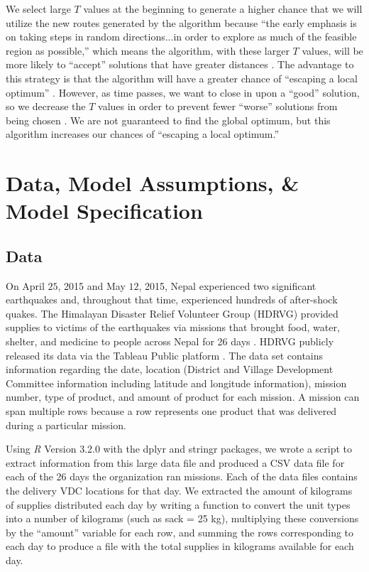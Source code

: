 \documentclass[11pt]{article}
\begin{document}
\noindent We select large $T$ values at the beginning to generate a higher chance that we will utilize the new routes generated by the algorithm because ``the early emphasis is on taking steps in random directions...in order to explore as much of the feasible region as possible,'' which means the algorithm, with these larger $T$ values, will be more likely to ``accept'' solutions that have greater distances \cite{LPOR_textbook}.  The advantage to this strategy is that the algorithm will have a greater chance of ``escaping a local optimum'' \cite{LPOR_textbook}.  However, as time passes, we want to close in upon a ``good'' solution, so we decrease the $T$ values in order to prevent fewer ``worse'' solutions from being chosen \cite{LPOR_textbook}. We are not guaranteed to find the global optimum, but this algorithm increases our chances of ``escaping a local optimum.''








\section{Data, Model Assumptions, \& Model Specification}

\subsection{Data}

On April $25$, 2015 and May $12$, 2015, Nepal experienced two significant earthquakes and, throughout that time, experienced hundreds of after-shock quakes. The Himalayan Disaster Relief Volunteer Group (HDRVG) provided supplies to victims of the earthquakes via missions that brought food, water, shelter, and medicine to people across Nepal for 26 days \cite{FB_HDRVG,HDRN_data,HDRVG_website}.  HDRVG publicly released its data via the Tableau Public platform \cite{HDRN_data}.  The data set contains information regarding the date, location (District and Village Development Committee information including latitude and longitude information), mission number, type of product, and amount of product for each mission.  A mission can span multiple rows because a row represents one product that was delivered during a particular mission.

Using \textit{R} Version 3.2.0 with the dplyr and stringr packages, we wrote a script to extract information from this large data file and produced a CSV data file for each of the 26 days the organization ran missions.  Each of the data files contains the delivery VDC locations for that day.  We extracted the amount of kilograms of supplies distributed each day by writing a function to convert the unit types into a number of kilograms (such as sack = 25 kg), multiplying these conversions by the ``amount'' variable for each row, and summing the rows corresponding to each day to produce a file with the total supplies in kilograms available for each day.
\end{document}
